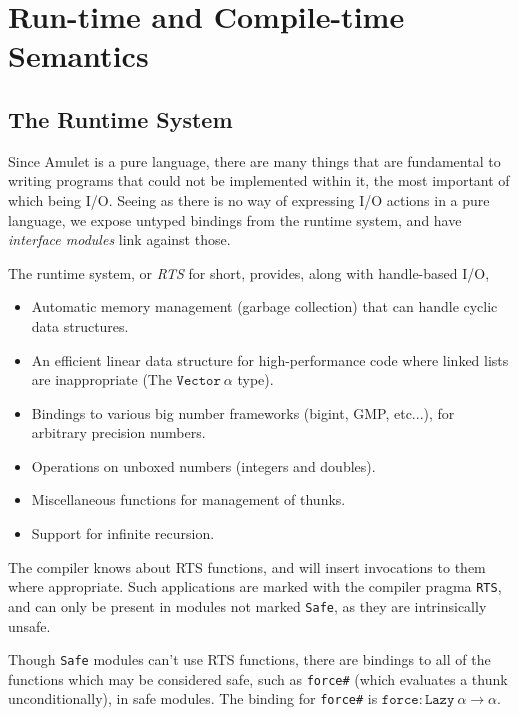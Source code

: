 \section{Run-time and Compile-time Semantics}

\subsection{The Runtime System}
Since Amulet is a pure language, there are many things that are fundamental to writing programs that could not be
implemented within it, the most important of which being I/O. Seeing as there is no way of expressing I/O actions in a
pure language, we expose untyped bindings from the runtime system, and have \textit{interface modules} link against
those.

The runtime system, or \textit{RTS} for short, provides, along with handle-based I/O,
\begin{itemize}
\item Automatic memory management (garbage collection) that can handle cyclic data structures.
\item An efficient linear data structure for high-performance code where linked lists are inappropriate (The
      $\mathtt{Vector}\ \alpha$ type).
\item Bindings to various big number frameworks (bigint, GMP, etc...), for arbitrary precision numbers.
\item Operations on unboxed numbers (integers and doubles).
\item Miscellaneous functions for management of thunks.
\item Support for infinite recursion.
\end{itemize}

The compiler knows about RTS functions, and will insert invocations to them where appropriate. Such applications are
marked with the compiler pragma \texttt{RTS}, and can only be present in modules not marked \texttt{Safe}, as they are
intrinsically unsafe.

Though \texttt{Safe} modules can't use RTS functions, there are bindings to all of the functions which may be considered
safe, such as \texttt{force\#} (which evaluates a thunk unconditionally), in safe modules. The binding for
\texttt{force\#} is $\mathtt{force}: \mathtt{Lazy}\ \alpha \to \alpha$.